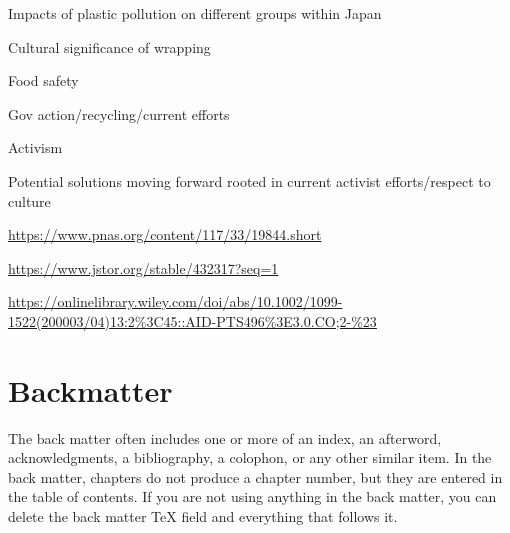 \documentclass{book}\usepackage{knitr}
\begin{document}
Impacts of plastic pollution on different groups within Japan

Cultural significance of wrapping

Food safety

Gov action/recycling/current efforts

Activism

Potential solutions moving forward rooted in current activist efforts/respect to culture

\url{https://www.pnas.org/content/117/33/19844.short}

\url{https://www.jstor.org/stable/432317?seq=1}

\url{https://onlinelibrary.wiley.com/doi/abs/10.1002/1099-1522(200003/04)13:2%3C45::AID-PTS496%3E3.0.CO;2-%23}






\backmatter

\part{Backmatter}

The back matter often includes one or more of an index, an afterword, acknowledgments, a bibliography, a colophon, or any other similar item. In the back matter, chapters do not produce a chapter number, but they are entered in the table of contents. If you are not using anything in the back matter, you can delete the back matter TeX field and everything that follows it.

\printglossary

\renewcommand\bibname{References}
\setlength{\bibsep}{2\baselineskip}
\setlength\bibindent{.5in}


\end{document}
